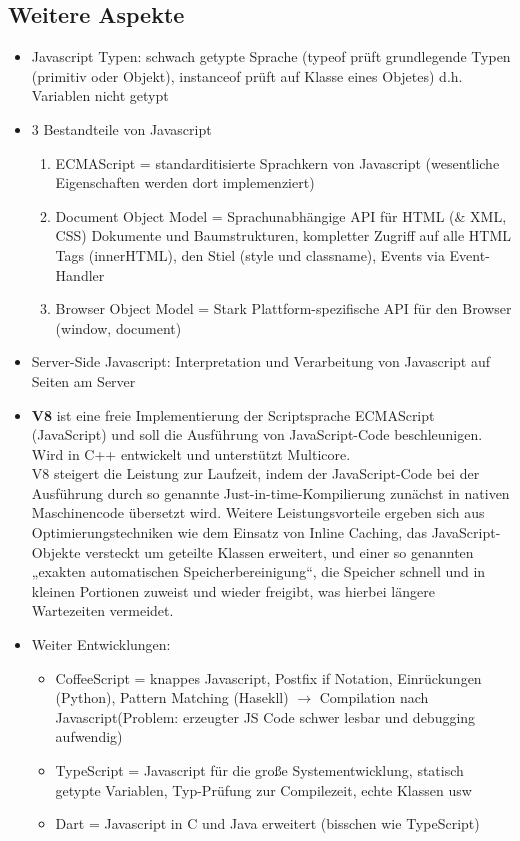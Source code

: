 \documentclass{article} %
\begin{document}
	\subsection{Weitere Aspekte}
	\begin{itemize}
		\item Javascript Typen: schwach getypte Sprache (typeof prüft grundlegende Typen (primitiv oder Objekt), instanceof prüft auf Klasse eines Objetes) d.h. Variablen nicht getypt
		\item 3 Bestandteile von Javascript
		\begin{enumerate}
			\item ECMAScript = standarditisierte Sprachkern von Javascript (wesentliche Eigenschaften werden dort implemenziert)
			\item Document Object Model = Sprachunabhängige API für HTML (\& XML, CSS) Dokumente und Baumstrukturen, kompletter Zugriff auf alle HTML Tags (innerHTML), den Stiel (style und classname), Events via Event-Handler
			\item Browser Object Model = Stark Plattform-spezifische API für den Browser (window, document)
		\end{enumerate}
		\item Server-Side Javascript: Interpretation und Verarbeitung von Javascript auf Seiten am Server
		\item \textbf{V8} ist eine freie Implementierung der Scriptsprache ECMAScript (JavaScript) und soll die Ausführung von JavaScript-Code beschleunigen. Wird in C++ entwickelt und unterstützt Multicore.\\
		V8 steigert die Leistung zur Laufzeit, indem der JavaScript-Code bei der Ausführung durch so genannte Just-in-time-Kompilierung zunächst in nativen Maschinencode übersetzt wird. Weitere Leistungsvorteile ergeben sich aus Optimierungstechniken wie dem Einsatz von Inline Caching, das JavaScript-Objekte versteckt um geteilte Klassen erweitert, und einer so genannten „exakten automatischen Speicherbereinigung“, die Speicher schnell und in kleinen Portionen zuweist und wieder freigibt, was hierbei längere Wartezeiten vermeidet.
		
		\item Weiter Entwicklungen:
		\begin{itemize}
			\item CoffeeScript = knappes Javascript, Postfix if Notation, Einrückungen (Python), Pattern Matching (Hasekll) $\rightarrow$ Compilation nach Javascript(Problem: erzeugter JS Code schwer lesbar und debugging aufwendig)
			\item TypeScript = Javascript für die große Systementwicklung, statisch getypte Variablen, Typ-Prüfung zur Compilezeit, echte Klassen usw
			\item Dart = Javascript in C und Java erweitert (bisschen wie TypeScript)
		\end{itemize}
	\end{itemize}
	
\end{document}
